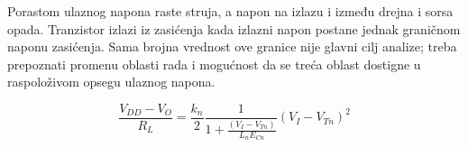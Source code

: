 Porastom ulaznog napona raste struja, a napon na izlazu i između drejna i sorsa opada. Tranzistor izlazi iz zasićenja kada izlazni napon postane jednak graničnom naponu zasićenja. Sama brojna vrednost ove granice nije glavni cilj analize; treba prepoznati promenu oblasti rada i mogućnost da se treća oblast dostigne u raspoloživom opsegu ulaznog napona.

\[\frac{V_{DD}-V_O}{R_L}=\frac{k_n}{2}\frac1{1+\frac{(V_I-V_{Tn})}{L_nE_{Cn}}}(V_I-V_{Tn})^2\]

